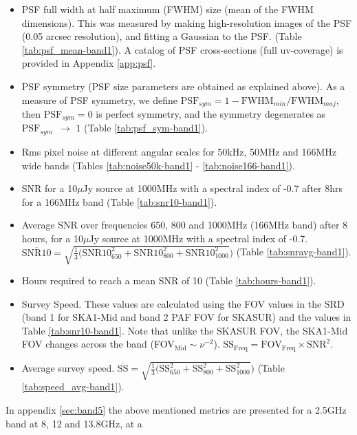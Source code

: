 \documentclass[sfheadings,a4paper,times,9pt,floats,floatfix]{article}
\begin{document}
\begin{itemize}
 \item PSF full width at half maximum (FWHM) size (mean of the FWHM dimensions). This was measured by making high-resolution
images of the PSF (0.05 arcsec resolution), and fitting a Gaussian to the PSF. (Table \ref{tab:psf_mean-band1}). A catalog of PSF
cross-sections (full uv-coverage) is provided in Appendix \ref{app:psf}.

 \item PSF symmetry (PSF size parameters are obtained as explained above). As a measure of PSF symmetry, we define 
$\text{PSF}_{sym}=1-\text{FWHM}_{min}/\text{FWHM}_{maj}$, then $\text{PSF}_{sym} = 0$ is perfect symmetry, and the symmetry
degenerates as $\text{PSF}_{sym}\,\,\, \rightarrow\,\,1$ (Table \ref{tab:psf_sym-band1}).

 \item Rms pixel noise at different angular scales for 50kHz, 50MHz and 166MHz wide bands (Tables \ref{tab:noise50k-band1} -
\ref{tab:noise166-band1}).
 
 \item SNR for a 10$\mu$Jy source at 1000MHz with a spectral index of -0.7 after 8hrs for a 166MHz band (Table
\ref{tab:snr10-band1}).
 
 \item Average SNR over frequencies 650, 800 and 1000MHz (166MHz band) after 8 hours, for a 10$\mu$Jy source at 1000MHz with a
spectral index of -0.7. {$\overline{\text{SNR10}}=\sqrt{\frac{1}{3}(\text{SNR10}_{650}^2 + \text{SNR10}_{800}^2
+\text{SNR10}_{1000}^2})$} (Table \ref{tab:snravg-band1}).

 \item Hours required to reach a mean SNR of 10 (Table \ref{tab:hours-band1}).
 
 \item Survey Speed. These values are calculated using the FOV values in the SRD (band 1 for SKA1-Mid and band 2 PAF FOV for
SKASUR) and the values in Table \ref{tab:snr10-band1}. Note that unlike the SKASUR FOV, the SKA1-Mid FOV changes across the band
(FOV$_{\text{Mid}}\sim \nu^{-2}$). $\text{SS}_\text{Freq} = \text{FOV}_\text{Freq}\times \text{SNR}^2$. 
 \item Average survey speed. {$\overline{\text{SS}} =\sqrt{\frac{1}{3}(\text{SS}_{650}^2 + \text{SS}_{800}^2
+\text{SS}_{1000}^2})$} (Table \ref{tab:speed_avg-band1}).
\end{itemize}
In appendix \ref{sec:band5} the above mentioned metrics are presented for a 2.5GHz band at 8, 12 and 13.8GHz, at a
\end{document}
